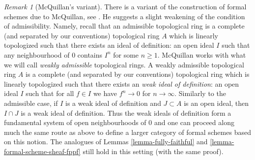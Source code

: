\documentclass{stacks-project}
\theoremstyle{plain}
\theoremstyle{definition}
\theoremstyle{remark}
\newtheorem{remark}[subsection]{Remark}
\numberwithin{equation}{subsection}
\begin{document}
\begin{remark}[McQuillan's variant]
\label{remark-mcquillan}
There is a variant of the construction of formal schemes due to
McQuillan, see \cite{McQuillan}.
He suggests a slight weakening of the condition of admissibility.
Namely, recall that an admissible topological ring is a complete
(and separated by our conventions) topological ring $A$
which is linearly topologized such that there exists an
ideal of definition: an
open ideal $I$ such that any neighbourhood of $0$ contains $I^n$
for some $n \geq 1$.
McQuillan works with what we will call {\it weakly admissible}
topological rings. A weakly admissible topological ring $A$ is a
complete (and separated by our conventions) topological ring
which is linearly topologized such that there exists an
{\it weak ideal of definition}: an open ideal $I$ such that
for all $f \in I$ we have
$f^n \to 0$ for $n \to \infty$. Similarly to the admissible case,
if $I$ is a weak ideal of definition and $J \subset A$ is an
open ideal, then $I \cap J$ is a weak ideal of definition.
Thus the weak ideals of definition form a fundamental system of
open neighbourhoods of $0$ and
one can proceed along much the same route as above
to define a larger category of formal schemes based
on this notion. The analogues of Lemmas \ref{lemma-fully-faithful} and
\ref{lemma-formal-scheme-sheaf-fppf}
still hold in this setting (with the same proof).
\end{remark}
\end{document}
